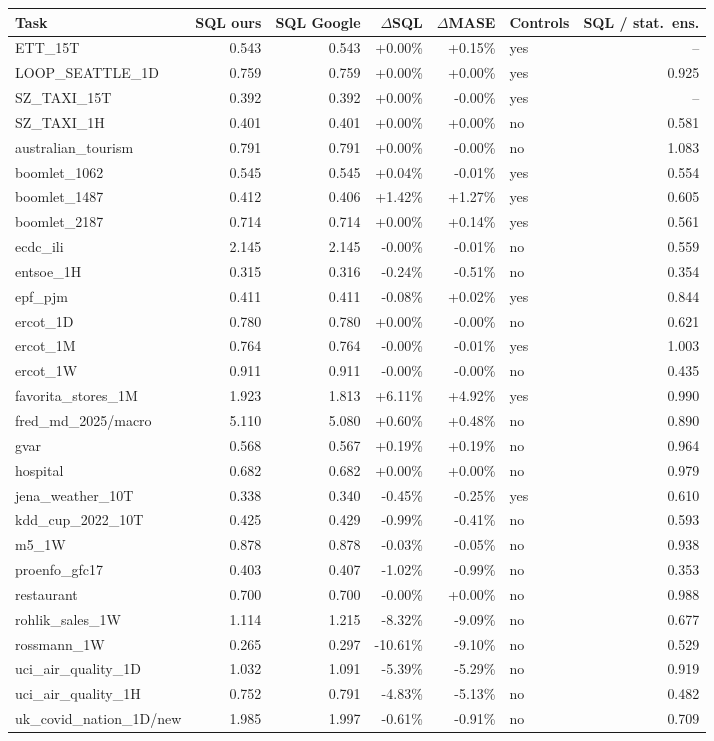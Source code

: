 \begin{tabular}{lrrrrlr}
\toprule
Task & SQL ours & SQL Google & $\Delta$SQL & $\Delta$MASE & Controls & SQL / stat.\ ens. \\
\midrule
ETT\_15T & 0.543 & 0.543 & +0.00\% & +0.15\% & yes & -- \\
LOOP\_SEATTLE\_1D & 0.759 & 0.759 & +0.00\% & +0.00\% & yes & 0.925 \\
SZ\_TAXI\_15T & 0.392 & 0.392 & +0.00\% & -0.00\% & yes & -- \\
SZ\_TAXI\_1H & 0.401 & 0.401 & +0.00\% & +0.00\% & no & 0.581 \\
australian\_tourism & 0.791 & 0.791 & +0.00\% & -0.00\% & no & 1.083 \\
boomlet\_1062 & 0.545 & 0.545 & +0.04\% & -0.01\% & yes & 0.554 \\
boomlet\_1487 & 0.412 & 0.406 & +1.42\% & +1.27\% & yes & 0.605 \\
boomlet\_2187 & 0.714 & 0.714 & +0.00\% & +0.14\% & yes & 0.561 \\
ecdc\_ili & 2.145 & 2.145 & -0.00\% & -0.01\% & no & 0.559 \\
entsoe\_1H & 0.315 & 0.316 & -0.24\% & -0.51\% & no & 0.354 \\
epf\_pjm & 0.411 & 0.411 & -0.08\% & +0.02\% & yes & 0.844 \\
ercot\_1D & 0.780 & 0.780 & +0.00\% & -0.00\% & no & 0.621 \\
ercot\_1M & 0.764 & 0.764 & -0.00\% & -0.01\% & yes & 1.003 \\
ercot\_1W & 0.911 & 0.911 & -0.00\% & -0.00\% & no & 0.435 \\
favorita\_stores\_1M & 1.923 & 1.813 & +6.11\% & +4.92\% & yes & 0.990 \\
fred\_md\_2025/macro & 5.110 & 5.080 & +0.60\% & +0.48\% & no & 0.890 \\
gvar & 0.568 & 0.567 & +0.19\% & +0.19\% & no & 0.964 \\
hospital & 0.682 & 0.682 & +0.00\% & +0.00\% & no & 0.979 \\
jena\_weather\_10T & 0.338 & 0.340 & -0.45\% & -0.25\% & yes & 0.610 \\
kdd\_cup\_2022\_10T & 0.425 & 0.429 & -0.99\% & -0.41\% & no & 0.593 \\
m5\_1W & 0.878 & 0.878 & -0.03\% & -0.05\% & no & 0.938 \\
proenfo\_gfc17 & 0.403 & 0.407 & -1.02\% & -0.99\% & no & 0.353 \\
restaurant & 0.700 & 0.700 & -0.00\% & +0.00\% & no & 0.988 \\
rohlik\_sales\_1W & 1.114 & 1.215 & -8.32\% & -9.09\% & no & 0.677 \\
rossmann\_1W & 0.265 & 0.297 & -10.61\% & -9.10\% & no & 0.529 \\
uci\_air\_quality\_1D & 1.032 & 1.091 & -5.39\% & -5.29\% & no & 0.919 \\
uci\_air\_quality\_1H & 0.752 & 0.791 & -4.83\% & -5.13\% & no & 0.482 \\
uk\_covid\_nation\_1D/new & 1.985 & 1.997 & -0.61\% & -0.91\% & no & 0.709 \\
\bottomrule
\end{tabular}
